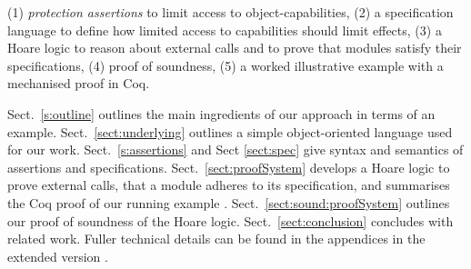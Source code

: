  

 
(1) \emph{protection assertions} to limit access to object-capabilities, %
(2) a specification language to define how limited access to capabilities should limit effects, %
(3) a Hoare logic to reason about external calls and to prove that modules satisfy their %
specifications,
(4) proof of soundness,
(5) a worked illustrative example {with a mechanised proof in Coq}.
 

Sect.\ \ref{s:outline}   outlines the main ingredients of our approach in terms of an {example}.
Sect.\ \ref{sect:underlying} outlines a simple object-oriented language used for our work. 
Sect.\ \ref{s:assertions} and 
 Sect \ref{sect:spec}  give syntax and semantics of assertions  and  specifications.
Sect.\ \ref{sect:proofSystem} develops a Hoare logic  
 to prove external calls,  that a module adheres to its   specification, and summarises  the Coq proof
  of  our running example 
 { . }
Sect.\ \ref{sect:sound:proofSystem} outlines {our} proof of soundness of
the Hoare logic. 
 Sect.\ \ref{sect:conclusion} concludes with related work. 
Fuller technical details can be found in the appendices %
{in the extended version \cite{externalCallsFull}.}

